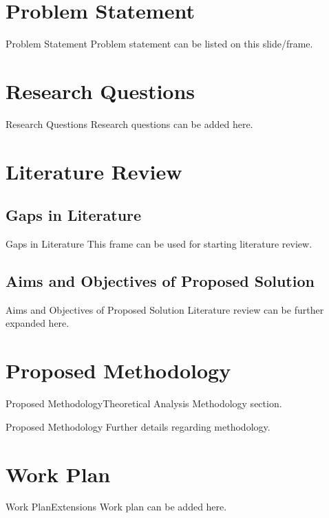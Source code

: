 \documentclass[xcolor=dvipsnames, compress]{beamer}
\begin{document}
\section{Problem Statement}
\begin{frame}{Problem Statement}
Problem statement can be listed on this slide/frame.
\end{frame}

\section{Research Questions}
\begin{frame}{Research Questions}
Research questions can be added here.
\end{frame}

\section{Literature Review}
\subsection{Gaps in Literature}


\begin{frame}{Gaps in Literature}
This frame can be used for starting literature review.

\end{frame}


\subsection{Aims and Objectives of Proposed Solution}

\begin{frame}{Aims and Objectives of Proposed Solution}
Literature review can be further expanded here.
\end{frame}


\section{Proposed Methodology}
\begin{frame}{Proposed Methodology}{Theoretical Analysis}
Methodology section.
\end{frame}


\begin{frame}{Proposed Methodology}
Further details regarding methodology.
\end{frame}

\section{Work Plan}
\begin{frame}{Work Plan}{Extensions}
Work plan can be added here.
\end{frame}
\end{document}
